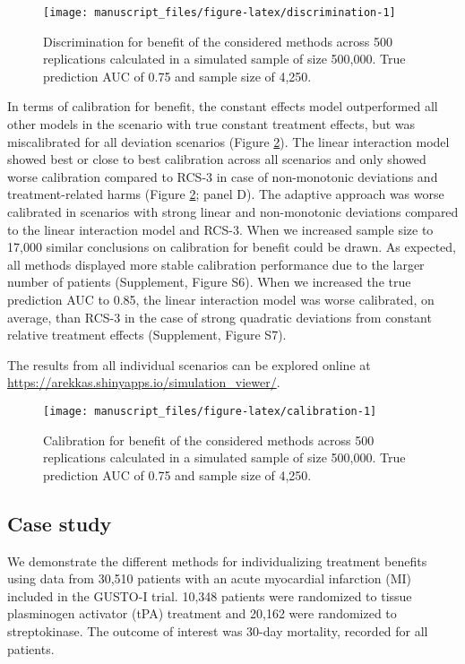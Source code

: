 \documentclass[]{elsarticle} %
\begin{document}
\begin{figure}
\texttt{[image: manuscript\_files/figure-latex/discrimination-1]} \caption{Discrimination for benefit of the considered methods across 500 replications calculated in a simulated sample of size 500,000. True prediction AUC of 0.75 and sample size of 4,250.}\label{fig:discrimination}
\end{figure}

In terms of calibration for benefit, the constant effects model
outperformed all other models in the scenario with true constant
treatment effects, but was miscalibrated for all deviation scenarios
(Figure \ref{fig:calibration}). The linear interaction model showed best
or close to best calibration across all scenarios and only showed worse
calibration compared to RCS-3 in case of non-monotonic deviations and
treatment-related harms (Figure \ref{fig:calibration}; panel D). The
adaptive approach was worse calibrated in scenarios with strong linear
and non-monotonic deviations compared to the linear interaction model
and RCS-3. When we increased sample size to 17,000 similar conclusions
on calibration for benefit could be drawn. As expected, all methods
displayed more stable calibration performance due to the larger number
of patients (Supplement, Figure S6). When we increased the true
prediction AUC to 0.85, the linear interaction model was worse
calibrated, on average, than RCS-3 in the case of strong quadratic
deviations from constant relative treatment effects (Supplement, Figure
S7).

The results from all individual scenarios can be explored online at
\url{https://arekkas.shinyapps.io/simulation_viewer/}.

\begin{figure}
\texttt{[image: manuscript\_files/figure-latex/calibration-1]} \caption{Calibration for benefit of the considered methods across 500 replications calculated in a simulated sample of size 500,000. True prediction AUC of 0.75 and sample size of 4,250.}\label{fig:calibration}
\end{figure}

\hypertarget{case-study}{%
\subsection{Case study}\label{case-study}}

We demonstrate the different methods for individualizing treatment
benefits using data from 30,510 patients with an acute myocardial
infarction (MI) included in the GUSTO-I trial. 10,348 patients were
randomized to tissue plasminogen activator (tPA) treatment and 20,162
were randomized to streptokinase. The outcome of interest was 30-day
mortality, recorded for all patients.
\end{document}
